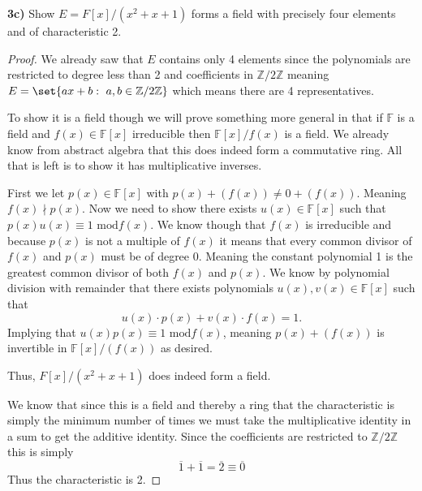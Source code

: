 \documentclass[12pt]{article}
\DeclarePairedDelimiter\set\{\}
\newcommand      {\Zm}         {{\mathbb Z}}
\newcommand      {\Fm}         {{\mathbb F}}
\begin{document}
\noindent\textbf{3c) } Show $E = F[x]/(x^2 + x + 1)$ forms a field with precisely four elements and of characteristic 2. 
\begin{proof}
    We already saw that $E$ contains only 4 elements since the polynomials are restricted to degree less than 2 and coefficients in $\Zm/2\Zm$ meaning $E = \set{ax + b :\ a,b \in \Zm/2\Zm}$ which means there are 4 representatives. 

    To show it is a field though we will prove something more general in that if $\Fm$ is a field and $f(x)\in \Fm[x]$ irreducible then $\Fm[x]/f(x)$ is a field. We already know from abstract algebra that this does indeed form a commutative ring. All that is left is to show it has multiplicative inverses. 
    
    First we let $p(x)\in \Fm[x]$ with $p(x) + (f(x)) \neq 0 + (f(x))$. Meaning $f(x)\nmid p(x)$. Now we need to show there exists $u(x) \in \Fm[x]$ such that $p(x)u(x) \equiv 1 \text{ mod} f(x)$. We know though that $f(x)$ is irreducible and because $p(x)$ is not a multiple of $f(x)$ it means that every common divisor of $f(x)$ and $p(x)$ must be of degree 0. Meaning the constant polynomial 1 is the greatest common divisor of both $f(x)$ and $p(x)$. We know by polynomial division with remainder that there exists polynomials $u(x),v(x)\in\Fm[x]$ such that \[u(x)\cdot p(x) + v(x)\cdot f(x) = 1.\] Implying that $u(x)p(x) \equiv 1 \text{ mod}f(x)$, meaning $p(x) + (f(x))$ is invertible in $\Fm[x]/(f(x))$ as desired. 

    Thus, $F[x]/(x^2 + x + 1)$ does indeed form a field. 

    We know that since this is a field and thereby a ring that the characteristic is simply the minimum number of times we must take the multiplicative identity in a sum to get the additive identity. Since the coefficients are restricted to $\Zm/2\Zm$ this is simply \[\overline{1} + \overline{1} = \overline{2} \equiv \overline{0}\]
    Thus the characteristic is 2. 
\end{proof}
\end{document}
